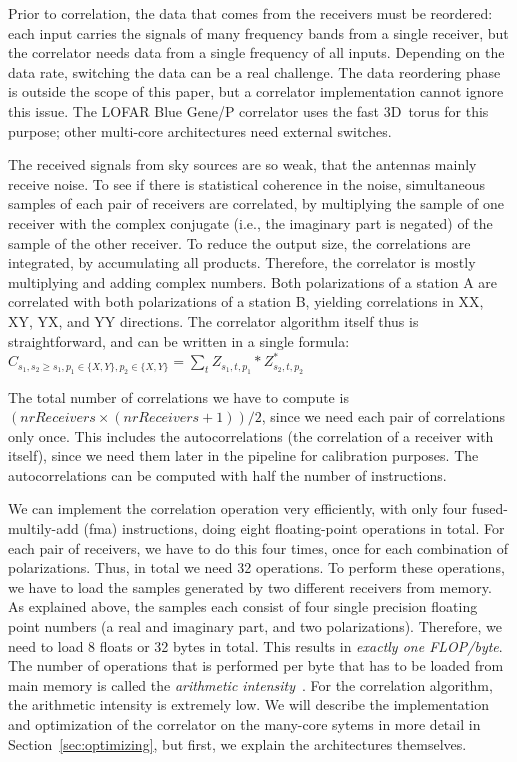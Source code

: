 \documentclass{article}
\begin{document}
Prior to correlation, the data that comes from
the receivers must be reordered:
each input carries the signals of many frequency bands from a single
receiver, but the correlator needs data from a single frequency of all inputs.
Depending on the data rate, switching the data can be a real challenge.
The data reordering phase is outside the scope of this paper, but a correlator
implementation cannot ignore this issue.
The LOFAR Blue Gene/P correlator uses the fast 3D~torus for this purpose;
other multi-core architectures need external switches.

The received signals from sky sources are so weak, that the antennas 
mainly receive noise. To see if there is statistical coherence
in the noise, simultaneous samples of each pair of receivers are correlated, 
by multiplying the sample of one receiver with the complex
conjugate (i.e., the imaginary part is negated) of the sample of the other receiver.
To reduce the output size, the correlations are integrated, by accumulating all products. 
Therefore, the correlator is mostly multiplying and adding complex numbers.
Both polarizations of a station A are correlated with both polarizations 
of a station B, yielding correlations in XX, XY, YX, and YY
directions.
The correlator algorithm itself thus is straightforward, and can be
written in a single formula: \\
$C_{s_1,s_2\geq s_1,p_1\in\{X,Y\},p_2\in\{X,Y\}} = \displaystyle\sum_{t} Z_{s_1,t,p_1} * Z_{s_2,t,p_2}^\ast$ 

The total number of correlations we have to compute is $(nrReceivers \times
(nrReceivers + 1)) / 2$, since we need each pair of correlations only
once. This includes the autocorrelations (the correlation of a receiver with itself),
since we need them later in the pipeline for calibration purposes.
The autocorrelations can be computed with half the number of instructions.

We can implement the correlation operation very efficiently, with only
four fused-multily-add (fma) instructions, doing eight floating-point
operations in total. For each pair of receivers, we have to do this
four times, once for each combination of polarizations. Thus, in total
we need 32 operations. To perform these operations, we have to load
the samples generated by two different receivers from memory.  As
explained above, the samples each consist of four single precision
floating point numbers (a real and imaginary part, and two
polarizations).  Therefore, we need to load 8 floats or 32 bytes in
total.  This results in \emph{exactly one FLOP/byte}.  The number of
operations that is performed per byte that has to be loaded from main
memory is called the \emph{arithmetic
  intensity}~\cite{system-performance}.  For the correlation
algorithm, the arithmetic intensity is extremely low.
We will describe the implementation and optimization of the correlator on the
many-core sytems in more detail in Section~\ref{sec:optimizing}, but first, we explain the architectures themselves. 
\end{document}
